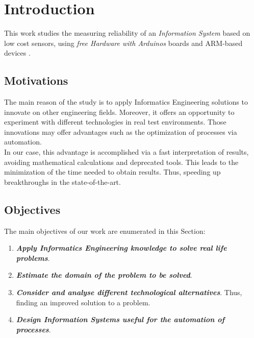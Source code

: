 
\chapter{Introduction}
\newpage


This work studies the measuring reliability of an \textit{Information System} based on low cost sensors, using \textit{free Hardware with Arduinos} \cite{arduino_mega, jjtorres_hardware_2014} boards and ARM-based devices \cite{arm, arm_architecture}.\\

\section{Motivations}

The main reason of the study is to apply Informatics Engineering solutions to innovate on other engineering fields. Moreover, it offers an opportunity to experiment with different technologies in real test environments. Those innovations may offer advantages such as the optimization of processes via automation. \\ 

In our case, this advantage is accomplished via a fast interpretation of results, avoiding mathematical calculations and deprecated tools. This leads to the minimization of the time needed to obtain results. Thus, speeding up breakthroughs in the state-of-the-art. \\

\section{Objectives}

The main objectives of our work are enumerated in this Section:

\begin{enumerate}

\item \textbf{\textit{Apply Informatics Engineering knowledge to solve real life problems}}.

\item \textbf{\textit{Estimate the domain of the problem to be solved}}. 

\item \textbf{\textit{Consider and analyse different technological alternatives}}. Thus, finding an improved solution to a problem. 

\item \textbf{\textit{Design Information Systems useful for the automation of processes}}.

\end{enumerate}


